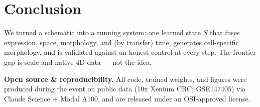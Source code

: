 \documentclass[10pt,twocolumn]{article}
\begin{document}
\section{Conclusion}
We turned a schematic into a running system: one learned state $S$ that fuses expression, space, morphology, and (by transfer) time, generates cell-specific morphology, and is validated against an honest control at every step. The frontier gap is scale and native 4D data --- not the idea.

\vspace{0.4em}
{\footnotesize\textbf{Open source \& reproducibility.} All code, trained weights, and figures were produced during the event on public data (10x Xenium CRC; GSE147405) via Claude Science + Modal A100, and are released under an OSI-approved license.}
\end{document}
